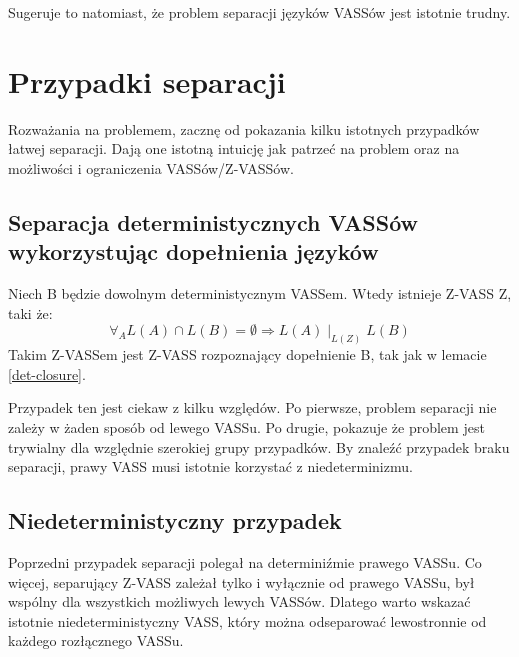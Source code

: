     Sugeruje to natomiast, że problem separacji języków VASSów jest istotnie trudny.







    \chapter{Przypadki separacji}
    Rozważania na problemem, zacznę od pokazania kilku istotnych przypadków łatwej separacji.
    Dają one istotną intuicję jak patrzeć na problem oraz na możliwości i ograniczenia VASSów/Z-VASSów.


    \section{Separacja deterministycznych VASSów wykorzystując dopełnienia języków}
    \begin{lemma}
        Niech B będzie dowolnym deterministycznym VASSem.
        Wtedy istnieje Z-VASS Z, taki że:
        \[\forall_A L(A) \cap L(B) = \emptyset \Rightarrow L(A) \mid_{L(Z)} L(B)\]
        Takim Z-VASSem jest Z-VASS rozpoznający dopełnienie B, tak jak w lemacie \ref{det-closure}.

    \end{lemma}
    Przypadek ten jest ciekaw z kilku względów.
    Po pierwsze, problem separacji nie zależy w żaden sposób od lewego VASSu.
    Po drugie, pokazuje że problem jest trywialny dla względnie szerokiej grupy przypadków.
    By znaleźć przypadek braku separacji, prawy VASS musi istotnie korzystać z niedeterminizmu.


    \section{Niedeterministyczny przypadek}
    Poprzedni przypadek separacji polegał na determiniźmie prawego VASSu.
    Co więcej, separujący Z-VASS zależał tylko i wyłącznie od prawego VASSu, był wspólny dla wszystkich możliwych lewych VASSów.
    Dlatego warto wskazać istotnie niedeterministyczny VASS, który można odseparować lewostronnie od każdego rozłącznego VASSu.


